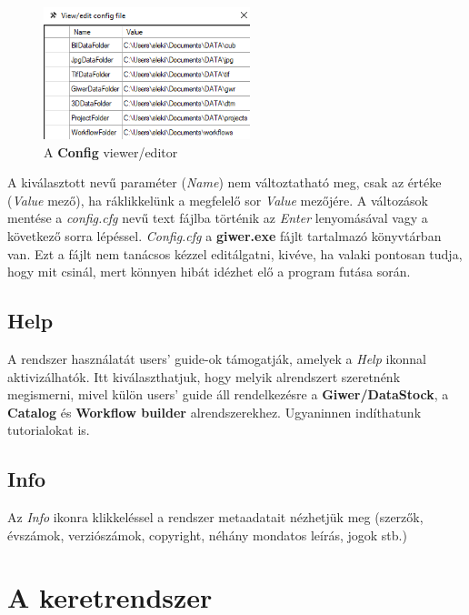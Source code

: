 \documentclass[a4paper,12pt]{article}
\begin{document}
 \begin{figure}[h]
 	\centering
 	\includegraphics[width=6cm]{config.png}
 	\caption{A \textbf{Config} viewer/editor}
 	\label{fig:config}
 \end{figure}
 

A kiválasztott nevű paraméter (\textit{Name}) nem változtatható meg, csak az értéke (\textit{Value} mező), ha ráklikkelünk a megfelelő sor \textit{Value} mezőjére. A változások mentése a \textit{config.cfg} nevű text fájlba történik az \textit{Enter} lenyomásával vagy a következő sorra lépéssel. \textit{Config.cfg} a \textbf{giwer.exe} fájlt tartalmazó könyvtárban van. Ezt a fájlt nem tanácsos kézzel editálgatni, kivéve, ha valaki pontosan tudja, hogy mit csinál, mert könnyen hibát idézhet elő a program futása során.



\subsection{Help}

A rendszer használatát users' guide-ok támogatják, amelyek a \textit{Help} ikonnal aktivizálhatók. Itt kiválaszthatjuk, hogy melyik alrendszert szeretnénk megismerni, mivel külön users' guide áll rendelkezésre a \textbf{Giwer/DataStock}, a \textbf{Catalog} és \textbf{Workflow builder} alrendszerekhez. Ugyaninnen indíthatunk tutorialokat is.


\subsection{Info}

Az \textit{Info} ikonra klikkeléssel a rendszer metaadatait nézhetjük meg (szerzők, évszámok, verziószámok, copyright, néhány mondatos leírás, jogok stb.)


\section{A keretrendszer}
\end{document}

